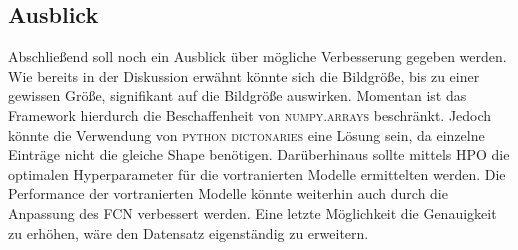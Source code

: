 \subsection{Ausblick}
Abschließend soll noch ein Ausblick über mögliche Verbesserung gegeben werden.
Wie bereits in der Diskussion erwähnt könnte sich die Bildgröße, bis zu einer
gewissen Größe, signifikant auf die Bildgröße auswirken. Momentan ist das
Framework hierdurch die Beschaffenheit von \textsc{numpy.arrays} beschränkt.
Jedoch könnte die Verwendung von \textsc{python} \textsc{dictonaries} eine Lösung sein,
da einzelne Einträge nicht die gleiche Shape benötigen. Darüberhinaus sollte mittels
HPO die optimalen Hyperparameter für die vortranierten Modelle ermittelten werden.
Die Performance der vortranierten Modelle könnte weiterhin auch durch die Anpassung
des FCN verbessert werden. Eine letzte Möglichkeit die Genauigkeit zu erhöhen,
wäre den Datensatz eigenständig zu erweitern.
\newpage
